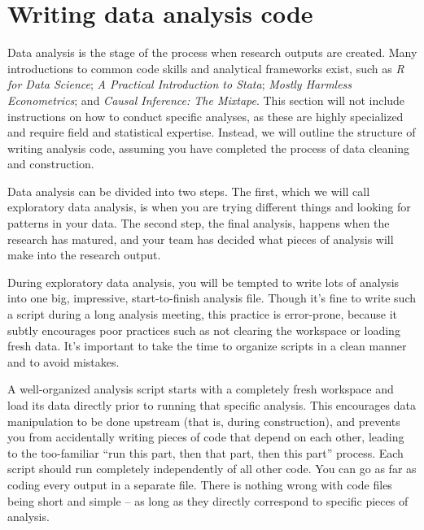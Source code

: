 \section{Writing data analysis code}

Data analysis is the stage of the process when research outputs are created. 
Many introductions to common code skills and analytical frameworks exist, such as
\textit{R for Data Science};
\textit{A Practical Introduction to Stata};
\textit{Mostly Harmless Econometrics}; and
\textit{Causal Inference: The Mixtape}.
This section will not include instructions on how to conduct specific analyses,
as these are highly specialized and require field and statistical expertise.
Instead, we will outline the structure of writing analysis code,
assuming you have completed the process of data cleaning and construction.

Data analysis can be divided into two steps. 
The first, which we will call exploratory data analysis, 
is when you are trying different things and looking for patterns in your data. 
The second step, the final analysis,
happens when the research has matured,
and your team has decided what pieces of analysis will make into the research output.

During exploratory data analysis,
you will be tempted to write lots of analysis 
into one big, impressive, start-to-finish analysis file. 
Though it's fine to write such a script during a long analysis meeting, 
this practice is error-prone, 
because it subtly encourages poor practices such as 
not clearing the workspace or loading fresh data. 
It's important to take the time to organize scripts in a clean manner and to avoid mistakes.

A well-organized analysis script starts with 
a completely fresh workspace and load its data directly
prior to running that specific analysis.
This encourages data manipulation to be done upstream (that is, during construction),
and prevents you from accidentally writing pieces of code
that depend on each other, leading to the too-familiar
``run this part, then that part, then this part'' process.
Each script should run completely independently of all other code.
You can go as far as coding every output in a separate file.
There is nothing wrong with code files being short and simple --
as long as they directly correspond to specific pieces of analysis.

